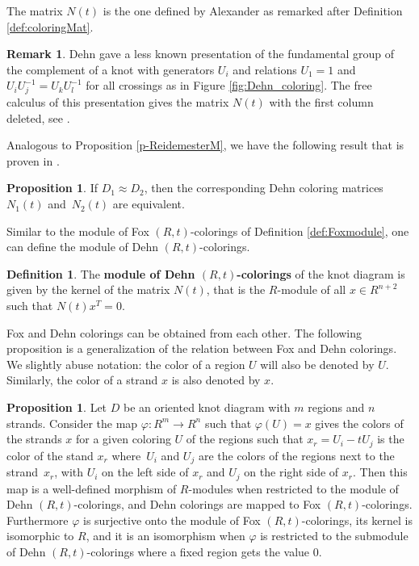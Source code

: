 \documentclass[11pt,a4paper]{article}
\theoremstyle{definition}
\newtheorem{proposition}[theorem]{Proposition}
\newtheorem{definition}[theorem]{Definition}
\newtheorem{remark}[theorem]{Remark}
\begin{document}
The matrix $N(t)$ is the one defined by Alexander \cite{alexander1928topological} as remarked after Definition \ref{def:coloringMat}.  

\begin{remark}\label{r-dehn}
Dehn \cite{dehn1910} gave a less known presentation of the fundamental group of the complement of a knot with generators $U_i$
and relations $U_1=1$ and $U_iU_j^{-1}=U_kU_l^{-1}$ for all crossings as in Figure \ref{fig:Dehn_coloring}.
The free calculus of this presentation gives the matrix $N(t)$ with the first column deleted, see \cite{kauffman1983}.
 
\end{remark}




Analogous to Proposition \ref{p-ReidemesterM}, we have the following result that is proven in \cite{alexander1928topological}.

\begin{proposition}\label{p-ReidemesterN}
If $D_1 \approx D_2$, 
then the corresponding Dehn coloring matrices~$N_1(t)$ and~$N_2(t)$ are equivalent.
\end{proposition}


Similar to the module of Fox $(R,t)$-colorings of Definition \ref{def:Foxmodule}, one can define the module of Dehn $(R,t)$-colorings.

\begin{definition}

The \textbf{module of Dehn $(R,t)$-colorings} of the knot diagram is given by the kernel of the matrix $N(t)$, 
that is the $R$-module of all $ x\in R^{n+2}$  such that $N(t)x^T=0.$
\end{definition}

Fox and Dehn colorings can be obtained from each other. 
The following proposition is a generalization of the relation between Fox and Dehn colorings. We slightly abuse notation: the color of a region $U$ will also be denoted by $U$. Similarly, the color of a strand $x$ is also denoted by $x$.

\begin{proposition}
\label{prop:fox2dehn}
Let $D$ be an oriented knot diagram with $m$ regions and $n$ strands. 
Consider the map $\varphi : R^m \rightarrow R^n$ such that  $\varphi (U)=x$ 
gives the colors of the strands $x$ for a given coloring $U$ of the regions
such that $x_r =U_i-tU_j$ is the color of the stand $x_r$ where~$U_i$ and $U_j$ are the colors of the regions next to the strand~$x_r$, with $U_i$ on the left side of $x_r$  and $U_j$ on the right side of $x_r$. 
Then this map is a well-defined morphism of $R$-modules when restricted to the module of Dehn $(R,t)$-colorings, and Dehn colorings are mapped to Fox  $(R,t)$-colorings. 
Furthermore $\varphi$ is surjective onto the module of Fox  $(R,t)$-colorings, its kernel is isomorphic to $R$, 
and it is an isomorphism when $\varphi$ is restricted to the submodule of Dehn $(R,t)$-colorings where a fixed region gets the value $0$.
\end{proposition}
\end{document}
